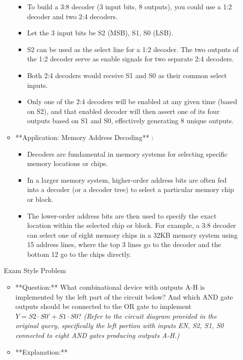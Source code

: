 \documentclass{article}
\begin{document}
\begin{itemize}
\begin{itemize}
        \begin{itemize}
            \item To build a 3:8 decoder (3 input bits, 8 outputs), you could use a 1:2 decoder and two 2:4 decoders.
            \item Let the 3 input bits be S2 (MSB), S1, S0 (LSB).
            \item S2 can be used as the select line for a 1:2 decoder. The two outputs of the 1:2 decoder serve as enable signals for two separate 2:4 decoders.
            \item Both 2:4 decoders would receive S1 and S0 as their common select inputs.
            \item Only one of the 2:4 decoders will be enabled at any given time (based on S2), and that enabled decoder will then assert one of its four outputs based on S1 and S0, effectively generating 8 unique outputs.
        \end{itemize}
    \item **Application: Memory Address Decoding** :
    
        \begin{itemize}
            \item Decoders are fundamental in memory systems for selecting specific memory locations or chips.
            \item In a larger memory system, higher-order address bits are often fed into a decoder (or a decoder tree) to select a particular memory chip or block.
            \item The lower-order address bits are then used to specify the exact location within the selected chip or block. For example, a 3:8 decoder can select one of eight memory chips in a 32KB memory system using 15 address lines, where the top 3 lines go to the decoder and the bottom 12 go to the chips directly.
        \end{itemize}
\end{itemize}

Exam Style Problem

\begin{itemize}
    \item **Question:** What combinational device with outputs A-H is implemented by the left part of the circuit below? And which AND gate outputs should be connected to the OR gate to implement $Y = S2 \cdot S0' + S1 \cdot S0$? \textit{ (Refer to the circuit diagram provided in the original query, specifically the left portion with inputs EN, S2, S1, S0 connected to eight AND gates producing outputs A-H.)}
    \item **Explanation:**
    

\end{itemize}
\end{itemize}
\end{document}
